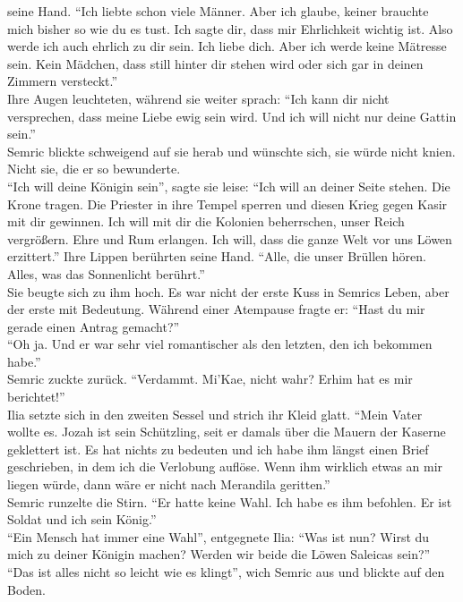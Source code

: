 seine Hand. ``Ich liebte schon viele Männer. Aber ich glaube, keiner brauchte mich bisher so 
wie du es tust. Ich sagte dir, dass mir Ehrlichkeit wichtig ist. Also werde ich auch ehrlich zu dir 
sein. Ich liebe dich. Aber ich werde keine Mätresse sein. Kein Mädchen, dass still hinter dir 
stehen wird oder sich gar in deinen Zimmern versteckt.''\\
Ihre Augen leuchteten, während sie weiter sprach: ``Ich kann dir nicht versprechen, dass meine 
Liebe ewig sein wird. Und ich will nicht nur deine Gattin sein.''\\
Semric blickte schweigend auf sie herab und wünschte sich, sie würde nicht knien. Nicht sie, die er 
so bewunderte.\\
``Ich will deine Königin sein'', sagte sie leise: ``Ich will an deiner Seite stehen. Die Krone 
tragen. Die Priester in ihre Tempel sperren und diesen Krieg gegen Kasir mit dir gewinnen. Ich will 
mit dir die Kolonien beherrschen, unser Reich vergrößern. Ehre und Rum erlangen. Ich will, dass die 
ganze Welt vor uns Löwen erzittert.'' Ihre Lippen berührten seine Hand. ``Alle, die unser Brüllen 
hören. Alles, was das Sonnenlicht berührt.''\\
Sie beugte sich zu ihm hoch. Es war nicht der erste Kuss in Semrics Leben, aber der erste mit 
Bedeutung. Während einer Atempause fragte er: ``Hast du mir gerade einen Antrag gemacht?''\\
``Oh ja. Und er war sehr viel romantischer als den letzten, den ich bekommen habe.''\\
Semric zuckte zurück. ``Verdammt. Mi'Kae, nicht wahr? Erhim hat es mir berichtet!''\\
Ilia setzte sich in den zweiten Sessel und strich ihr Kleid glatt. ``Mein Vater wollte es. Jozah 
ist sein Schützling, seit er damals über die Mauern der Kaserne geklettert ist. Es hat nichts zu 
bedeuten und ich habe ihm längst einen Brief geschrieben, in dem ich die Verlobung auflöse. Wenn 
ihm wirklich etwas an mir liegen würde, dann wäre er nicht nach Merandila geritten.''\\
Semric runzelte die Stirn. ``Er hatte keine Wahl. Ich habe es ihm befohlen. Er ist Soldat und 
ich sein König.''\\
``Ein Mensch hat immer eine Wahl'', entgegnete Ilia: ``Was ist nun? Wirst du mich zu deiner Königin 
machen? Werden wir beide die Löwen Saleicas sein?''\\
``Das ist alles nicht so leicht wie es klingt'', wich Semric aus und blickte auf den Boden.\\
